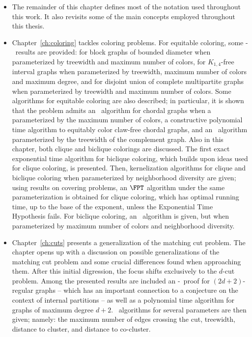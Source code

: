 \begin{itemize}
    \item The remainder of this chapter defines most of the notation used throughout this work.
    It also revisits some of the main concepts employed throughout this thesis.
    \item Chapter~\ref{ch:coloring} tackles coloring problems.
    For equitable coloring, some \W[1]-\Hness\ results are provided: for block graphs of bounded diameter when parameterized by treewidth and maximum number of colors, for $K_{1,4}$-free interval graphs when parameterized by treewidth, maximum number of colors and maximum degree, and for disjoint union of complete multipartite graphs when parameterized by treewidth and maximum number of colors.
    Some algorithms for equitable coloring are also described; in particular, it is shown that the problem admits an \XP\ algorithm for chordal graphs when a parameterized by the maximum number of colors, a constructive polynomial time algorithm to equitably color claw-free chordal graphs, and an \FPT\ algorithm parameterized by the treewidth of the complement graph.
    Also in this chapter, both clique and biclique colorings are discussed.
    The first exact exponential time algorithm for biclique coloring, which builds upon ideas used for clique coloring, is presented.
    Then, kernelization algorithms for clique and biclique coloring when parameterized by neighborhood diversity are given; using results on covering problems, an $\FPT$ algorithm under the same parameterization is obtained for clique coloring, which has optimal running time, up to the base of the exponent, unless the Exponential Time Hypothesis fails.
    For biclique coloring, an \FPT\ algorithm is given, but when parameterized by maximum number of colors and neighborhood diversity.
    \item Chapter~\ref{ch:cuts} presents a generalization of the matching cut problem.
    The chapter opens up with a discussion on possible generalizations of the matching cut problem and some crucial differences found when approaching them.
    After this initial digression, the focus shifts exclusively to the $d$-cut problem.
    Among the presented results are included an \NP-\Hness\ proof for $(2d+2)$-regular graphs -- which has an important connection to a conjecture on the context of internal partitions -- as well as a polynomial time algorithm for graphs of maximum degree $d + 2$.
    \FPT\ algorithms for several parameters are then given; namely: the maximum number of edges crossing the cut, treewidth, distance to cluster, and distance to co-cluster.

\end{itemize}
